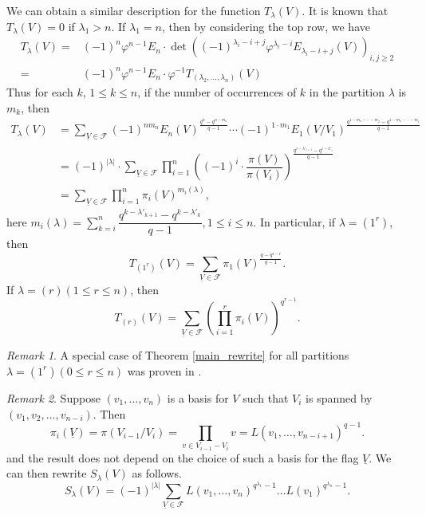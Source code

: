 \documentclass[12pt,a4paper]{report}
\theoremstyle{definition}
\theoremstyle{remark}
\newtheorem*{remark}{Remark}
\theoremstyle{definition}
\begin{document}
We can obtain a similar description for the function $T_{\lambda}(V)$. It is known that $T_{\lambda} (V) = 0$ if $\lambda_1 > n$. If $\lambda_1 = n$, then by considering the top row, we have
\begin{align*}
    T_{\lambda} (V) =& (-1)^{n} \varphi^{n-1} E_n \cdot \det ((-1)^{\lambda_i - i+ j}\varphi^{\lambda_i - i} E_{\lambda_i - i+ j}(V))_{i,j \geq 2}\\
    =& (-1)^{n} \varphi^{n-1} E_n \cdot \varphi^{-1}T_{(\lambda_2, \ldots, \lambda_n)}(V) 
\end{align*}
 Thus for each $k$, $1 \leq k \leq n$, if the number of occurrences of $k$ in the partition $\lambda$ is $m_k$, then 
 \begin{align*}
     T_{\lambda}(V) &= \sum\limits_{\underline{V}\in \mathcal{F}}(-1)^{nm_n}E_n(V)^{\frac{q^n - q^{n-m_n}}{q-1}}\cdots (-1)^{1\cdot m_1}E_{1}(V/V_1)^{\frac{q^{1-m_n-\cdots-m_2}-q^{1-m_n-\cdots - m_{1}}}{q-1}}\\
     &=(-1)^{|\lambda|}\cdot \sum\limits_{\underline{V}\in \mathcal{F}}\prod\limits_{i=1}^{n}\left((-1)^i\cdot \dfrac{\pi(V)}{\pi(V_i)}\right)^{\frac{q^{i-\lambda'_{i+1}}-q^{i-\lambda'_i}}{q-1}}\\
     &=\sum\limits_{\underline{V}\in \mathcal{F}}\prod\limits_{i=1}^{n}\pi_i(V)^{m_i(\lambda)},
 \end{align*}
 here $m_i(\lambda) = \sum\limits_{k=i}^{n}\dfrac{q^{k-\lambda'_{k+1}}-q^{k-\lambda'_k}}{q-1}, 1\leq i\leq n$. In particular, if $\lambda = (1^r)$, then 
 \begin{equation*}
     T_{(1^r)}(V) =\sum\limits_{\underline{V}\in \mathcal{F}}\pi_1(V)^{\frac{q-q^{1-r}}{q-1}}. 
 \end{equation*}
If $\lambda = (r) (1\leq r\leq n)$, then
\begin{equation*}
    T_{(r)}(V)=\sum\limits_{\underline{V}\in \mathcal{F}}\left(\prod\limits_{i=1}^{r}\pi_i(V)\right)^{q^{r-1}}.
\end{equation*}
\begin{remark}
    A special case of Theorem \ref{main_rewrite} for all partitions $\lambda = (1^r) (0\leq r\leq n)$ was proven in \cite[Chapter I, Section 2, Example 26(e)]{macdonald_symmetric_1979}.
\end{remark}
\begin{remark}
Suppose $(v_1, \ldots, v_n)$ is a basis for $V$ such that $V_i$ is spanned by $(v_1, v_{2}, \ldots, v_{n-i})$. Then 
\begin{equation*}
\pi_i (\underline{V}) = \pi (V_{i-1}/V_{i}) = \prod_{v \in V_{i-1} - V_{i}} v = L(v_1, \ldots, v_{n-i+1})^{q-1}. 
\end{equation*}
and the result does not depend on the choice of such a basis for the flag $\underline{V}$. We can then rewrite $S_{\lambda}(V)$ as follows. 
\begin{equation}
S_{\lambda} (V) = (-1)^{|\lambda|} \sum_{\underline{V} \in \mathcal{F}} L (v_1, \ldots, v_n)^{q^{\lambda_1}-1} \ldots L(v_1)^{q^{\lambda_n}-1}. 
\end{equation}
\end{remark}
\end{document}
